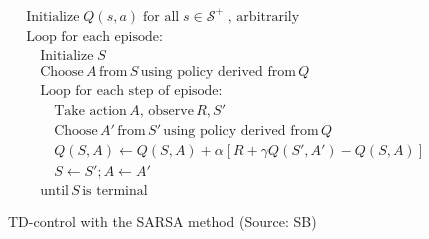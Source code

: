 \begin{figure}
\small
\begin{pseudocodebox}
\vspace{-\baselineskip}
\begin{align*}
& \text{Initialize}\; Q(s, a) \; \text{for all} \; s \in \mathcal{S}^+ \; \text{, arbitrarily} \\
& \text{Loop for each episode:} \\
& \quad \text{Initialize}\; S \\
& \quad \text{Choose} \, A \, \text{from}\, S \, \text{using policy derived from} \, Q \\
& \quad \text{Loop for each step of episode:} \\
& \quad \quad \text{Take action}\, A, \, \text{observe} \, R, S' \\
& \quad \quad \text{Choose}\, A' \, \text{from}\, S' \, \text{using policy derived from} \, Q \\ 
& \quad \quad Q(S, A) \leftarrow Q(S, A) + \alpha \left[ R + \gamma Q(S', A') - Q(S, A) \right] \\
& \quad \quad S \leftarrow S'; A \leftarrow A' \\
& \quad \text{until}\, S\, \text{is terminal}
\end{align*}
\end{pseudocodebox}
\caption[TD-control with SARSA]{TD-control with the SARSA method (Source: SB)}
\label{fig:sarsa}
\end{figure}

